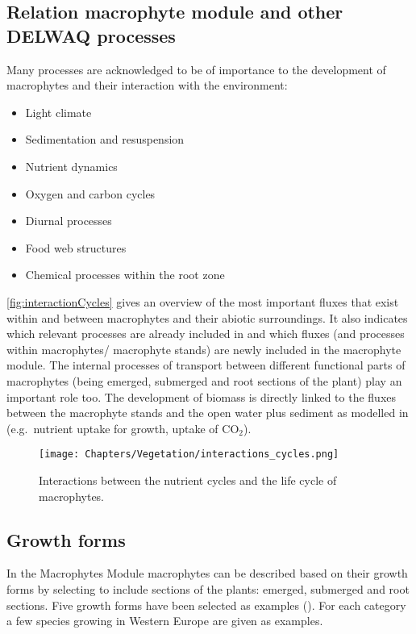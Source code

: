 \subsection{Relation macrophyte module and other DELWAQ processes}

Many processes are acknowledged to be of importance to the development of macrophytes and their
interaction with the environment:
\begin{itemize}
\item   Light climate
\item   Sedimentation and resuspension
\item   Nutrient dynamics
\item   Oxygen and carbon cycles
\item   Diurnal processes
\item   Food web structures
\item   Chemical processes within the root zone
\end{itemize}

\autoref{fig:interactionCycles} gives an overview of the most important fluxes that exist within and between
macrophytes and their abiotic surroundings. It also indicates which relevant processes are already included
in \DWAQ and which fluxes (and processes within macrophytes/ macrophyte stands) are newly included in the
\DWAQ macrophyte module. The internal processes of transport between different functional parts of macrophytes
(being emerged, submerged and root sections of the plant) play an important role too. The development of biomass
is directly linked to the fluxes between the macrophyte stands and the open water plus sediment as modelled in
\DWAQ (e.g.\ nutrient uptake for growth, uptake of CO$_2$).

\begin{figure}
\texttt{[image: Chapters/Vegetation/interactions\_cycles.png]}
\caption{Interactions between the nutrient cycles and the life cycle of macrophytes.}
\label{fig:interactionCycles}
\end{figure}

\subsection{Growth forms}
In the Macrophytes Module macrophytes can be described based on their growth forms by selecting to include
sections of the plants: emerged, submerged and root sections. Five growth forms have been selected as examples
(). For each category a few species growing in Western Europe are given as examples.

